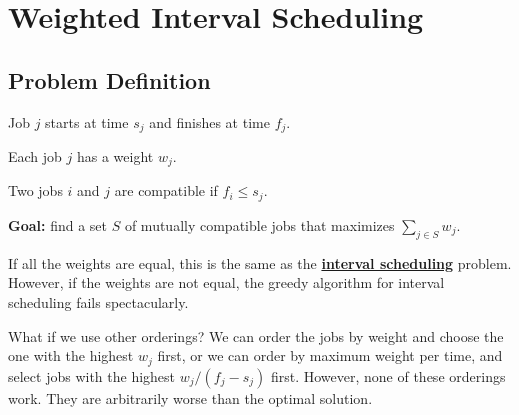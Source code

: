 \section{Weighted Interval Scheduling}

\subsection{Problem Definition}

\begin{listu}
    \item Job $j$ starts at time $s_j$ and finishes at time $f_j$.
    \item Each job $j$ has a weight $w_j$.
    \item Two jobs $i$ and $j$ are compatible if $f_i \leq s_j$.
    \item \textbf{Goal:} find a set $S$ of mutually compatible jobs that maximizes $\sum_{j \in S} w_j$.
\end{listu}

If all the weights are equal, this is the same as the \hyperref[sec:interval-scheduling]{\textbf{interval scheduling}} problem. However, if the weights are not equal, the greedy algorithm for interval scheduling fails spectacularly.

\begin{center}
    \tikzexternalenable
    \tikzexternaldisable
\end{center}

What if we use other orderings? We can order the jobs by weight and choose the one with the highest $w_j$ first, or we can order by maximum weight per time, and select jobs with the highest $w_j / (f_j - s_j)$ first. However, none of these orderings work. They are arbitrarily worse than the optimal solution. 

